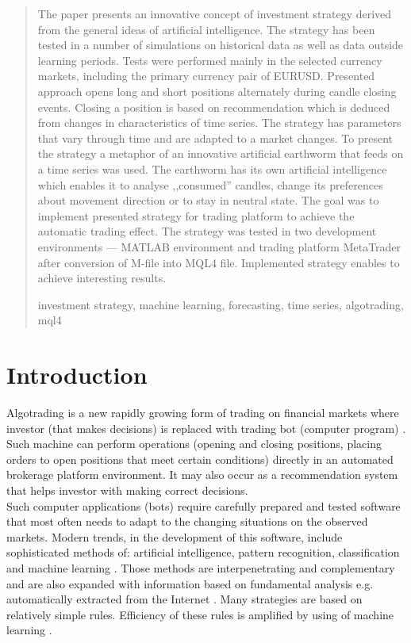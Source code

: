 \documentclass[runningheads,a4paper]{llncs}
\newcommand{\keywords}[1]{\par\addvspace\baselineskip
\noindent\keywordname\enspace\ignorespaces#1}
\begin{document}
\begin{abstract}
The paper presents an innovative concept of investment strategy derived from the general ideas of artificial intelligence. The strategy has been tested in a number of simulations on historical data as well as data outside learning periods. Tests were performed mainly in the selected currency markets, including the primary currency pair of EURUSD. Presented approach opens long and short positions alternately during candle closing events. Closing a position is based on recommendation which is deduced from changes in characteristics of time series. The strategy has parameters that vary through time and are adapted to a market changes. To present the strategy a metaphor of an innovative artificial earthworm that feeds on a time series was used. The earthworm has its own artificial intelligence which enables it to analyse ,,consumed'' candles, change its preferences about movement direction or to stay in neutral state. The goal was to implement presented strategy for trading platform to achieve the automatic trading effect.  The strategy was tested in two development environments --- MATLAB environment and trading platform MetaTrader after conversion of M-file into MQL4 file. Implemented strategy enables to achieve interesting results.
\keywords{investment strategy, machine learning, forecasting, time series, algotrading, mql4}
\end{abstract}


\section{Introduction}

Algotrading is a new rapidly growing form of trading on financial markets where investor (that makes decisions) is replaced with trading bot (computer program) \cite{Leshik2011,Wilinski2014}. Such machine can perform operations (opening and closing positions, placing orders to open positions that meet certain conditions) directly in an automated brokerage platform environment. It may also occur as a recommendation system that helps investor with making correct decisions.\\

Such computer applications (bots) require carefully prepared and tested software that most often needs to adapt to the changing situations on the observed markets. Modern trends, in the development of this software, include sophisticated methods of: artificial intelligence, pattern recognition, classification and machine learning \cite{Leshik2011,Wilinski,wang,sinclare}. Those methods are interpenetrating and complementary and are also expanded with information based on fundamental analysis e.g. automatically extracted from the Internet \cite{elder,Wilinski2014,Schwager1996}. Many strategies are based on relatively simple rules. Efficiency of these rules is amplified by using of machine learning \cite{Wilinski,person,tian,krutsinger,lewis,murphy}.\\
\end{document}
